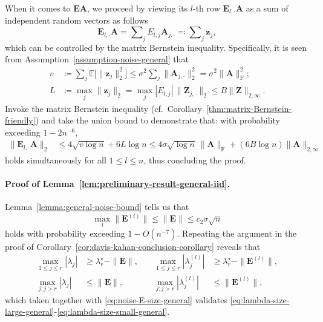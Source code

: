 When it comes to $\bm{E}\bm{A}$, we proceed by viewing its $l$-th
row $\bm{E}_{l,\cdot}\bm{A}$ as a sum of independent random vectors
as follows
\[
\bm{E}_{l,\cdot}\bm{A}=\sum\nolimits _{j}E_{l,j}\bm{A}_{j,\cdot}\eqqcolon\sum\nolimits _{j}\bm{z}_{j},
\]
which can be controlled by the matrix Bernstein inequality. Specifically,
it is seen from Assumption~\ref{assumption-noise-general} that
\begin{align*}
v & \coloneqq\sum\nolimits _{j}\mathbb{E}\big[\|\bm{z}_{j}\|_{2}^{2}\big]%
\leq\sigma^{2}\sum\nolimits _{j}\big\|\bm{A}_{j,\cdot}\big\|_{2}^{2}=\sigma^{2}\|\bm{A}\|_{\mathrm{F}}^{2};\\
L & \coloneqq\max_{j}\|\bm{z}_{j}\|_{2}=\max_{j}|E_{l,j}|\,\big\|\bm{Z}_{j,\cdot}\big\|_{2}\leq B\|\bm{Z}\|_{2,\infty}.
\end{align*}
Invoke the matrix Bernstein inequality (cf.~Corollary~\ref{thm:matrix-Bernstein-friendly})
and take the union bound to demonstrate that: with probability exceeding
$1-2n^{-6}$,
\begin{align*}
\big\|\bm{E}_{l,\cdot}\bm{A}\big\|_{2} & \leq4\sqrt{v\log n}+6L\log n\leq4\sigma\sqrt{\log n}\,\|\bm{A}\|_{\mathrm{F}}+(6B\log n)\|\bm{A}\|_{2,\infty}
\end{align*}
holds simultaneously for all $1\leq l\leq n$, thus concluding the
proof.

\paragraph{Proof of Lemma~\ref{lem:preliminary-result-general-iid}.}

Lemma~\ref{lemma:general-noise-bound} tells us that
\begin{equation}
\max_{l}\big\|\bm{E}^{(l)}\big\|\leq\|\bm{E}\|\leq c_{2}\sigma\sqrt{n}\label{eq:noise-E-size-general}
\end{equation}
holds with probability exceeding $1-O(n^{-7})$. Repeating the argument
in the proof of Corollary~\ref{cor:davis-kahan-conclusion-corollary}
reveals that \begin{subequations}
\begin{align}
\max_{1\leq j\leq r}|\lambda_{j}| & \geq\lambda_{r}^{\star}-\|\bm{E}\|,\quad & \max_{1\leq j\leq r}|\lambda_{j}^{(l)}| & \geq\lambda_{r}^{\star}-\|\bm{E}^{(l)}\|,\\
\max_{j:j>r}|\lambda_{j}| & \leq\|\bm{E}\|, & \max_{j:j>r}|\lambda_{j}^{(l)}| & \leq\|\bm{E}^{(l)}\|,
\end{align}
\end{subequations} which taken together with \eqref{eq:noise-E-size-general}
validates \eqref{eq:lambda-size-large-general}-\eqref{eq:lambda-size-small-general}.

